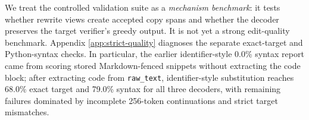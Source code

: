 \documentclass[11pt,a4paper]{article}
\begin{document}
We treat the controlled validation suite as a \emph{mechanism benchmark}: it
tests whether rewrite views create accepted copy spans and whether the
decoder preserves the target verifier's greedy output. It is not yet a strong
edit-quality benchmark. Appendix \ref{app:strict-quality} diagnoses the
separate exact-target and Python-syntax checks. In particular, the earlier
identifier-style 0.0\% syntax report came from scoring stored Markdown-fenced
snippets without extracting the code block; after extracting code from
\texttt{raw\_text}, identifier-style substitution reaches 68.0\% exact target and 79.0\%
syntax for all three decoders, with remaining failures dominated by incomplete
256-token continuations and strict target mismatches.

\begin{table}[h]
\centering\scriptsize
\caption{Decoder parity on headline workloads. Greedy equivalence is claimed
for the audited fp32/eager and fp32/sdpa columns. The bf16/sdpa columns are
timing-path diagnostics and contain observed rare raw-output drift. Strict
target/syntax checks are appendix diagnostics.}
\label{tab:quality}
\end{table}
\end{document}
